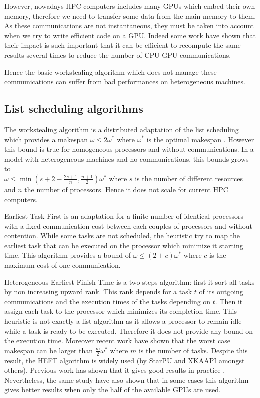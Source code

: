 \documentclass[10pt, conference, compsocconf,pdftex,dvipsnames]{IEEEtran}
\begin{document}
However, nowadays HPC computers includes many GPUs which embed their own
memory, therefore we need to transfer some data from the main memory
to them. As these communications are not instantaneous, they must be taken
into account when we try to write efficient code on a GPU.  Indeed some work
\cite{venkatasubramanian2009tuned} have shown that their impact is such
important that it can be efficient to recompute the same results several
times to reduce the number of CPU-GPU communications.  

Hence the basic workstealing algorithm which does not manage these
communications can suffer from bad performances on heterogeneous machines. 

\subsection{List scheduling algorithms}

The workstealing algorithm is a distributed adaptation of the list scheduling
which provides a makespan $\omega\leq2\omega^*$ where $\omega^*$ is the optimal
makespan \cite{GrahamRL1966Bounds, GrahamRL1969Bounds}. However this bound is
true for homogeneous processors and without communications. In a model with
heterogeneous machines and no communications, this bounds grows to\\
$\omega\leq\min(s+2-\frac{2s+1}{n},\frac{n+1}{2})\omega^*$ where $s$ is the
number of different resources and $n$ the number of processors. Hence it
does not scale for current HPC computers. 

Earliest Task First\cite{hwang1989scheduling} is an adaptation for a finite
number of identical processors with a fixed communication cost between each
couples of processors and without contention. While some tasks are not
scheduled, the heuristic try to map the earliest task that can be executed on
the processor which minimize it starting time. This algorithm provides a bound
of $\omega\leq(2+c)\omega^*$ where $c$ is the maximum cost of one
communication.  

Heterogeneous Earliest Finish Time \cite{topcuoglu2002performance}  is a two
steps algorithm: first it sort all tasks by non increasing upward rank. This
rank depends for a task $t$ of its outgoing communications and the execution
times of the tasks depending on $t$. Then it assign each task to the processor
which minimizes its completion time. This heuristic is not exactly a list
algorithm as it allows a processor to remain idle while a task is ready to be
executed. Therefore it does not provide any bound on the execution time.
Moreover recent work \cite{Kedad-SidhoumMonnaMounieEtAl2013} have shown that
the worst case makespan can be larger than $\frac{m}{2}\omega^*$ where $m$ is
the number of tasks. Despite this result, the HEFT algorithm is widely used
(by StarPU and XKAAPI amongst others). Previous work has shown that it gives
good results in practice \cite{ferreiralima:hal-00735470}. Nevertheless, the
same study have also shown that in some cases this algorithm gives better
results when only the half of the available GPUs are used.
\end{document}
